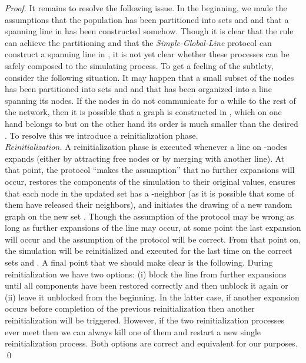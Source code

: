 \documentclass[oribibl, 11pt]{llncs}
\begin{document}
\begin{proof}
It remains to resolve the following issue. In the beginning, we made the assumptions that the population has been partitioned into sets  and  and that a spanning line in  has been constructed somehow. Though it is clear that the rule  can achieve the partitioning and that the \emph{Simple-Global-Line} protocol can construct a spanning line in , it is not yet clear whether these processes can be safely composed to the simulating process. To get a feeling of the subtlety, consider the following situation. It may happen that a small subset  of the nodes has been partitioned into sets  and  and that  has been organized into a line spanning its nodes. If the nodes in  do not communicate for a while to the rest of the network, then it is possible that a graph is constructed in , which on one hand belongs to  but on the other hand its order is much smaller than the desired . To resolve this we introduce a reinitialization phase.\\

\vspace{-3pt}
\noindent\emph{Reinitialization.} A reinitialization phase is executed whenever a line on -nodes expands (either by attracting free nodes or by merging with another line). At that point, the protocol ``makes the assumption'' that no further expansions will occur, restores the components of the simulation to their original values, ensures that each node in the updated set  has a -neighbor (as it is possible that some of them have released their neighbors), and initiates the drawing of a new random graph on the new set . Though the assumption of the protocol may be wrong as long as further expansions of the line may occur, at some point the last expansion will occur and the assumption of the protocol will be correct. From that point on, the simulation will be reinitialized and executed for the last time on the correct sets  and . A final point that we should make clear is the following. During reinitialization we have two options: (i) block the line from further expansions until all components have been restored correctly and then unblock it again or (ii) leave it unblocked from the beginning. In the latter case, if another expansion occurs before completion of the previous reinitialization then another reinitialization will be triggered. However, if the two reinitialization processes ever meet then we can always kill one of them and restart a new single reinitialization process. Both options are correct and equivalent for our purposes. 
\qed
\end{proof}
\end{document}
